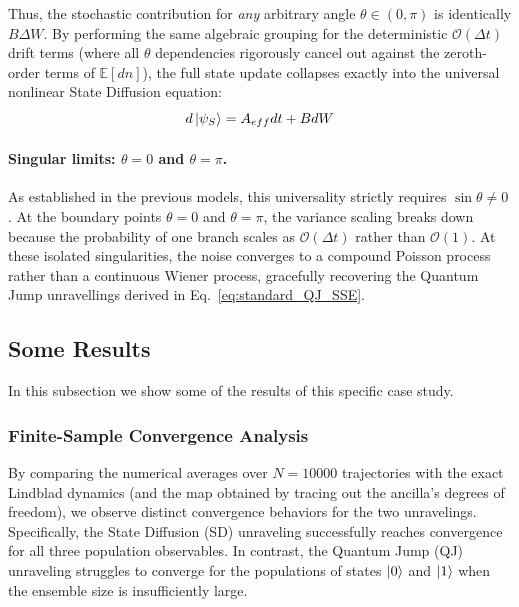 \documentclass[a4paper,12pt]{article}
\begin{document}
Thus, the stochastic contribution for \emph{any} arbitrary angle $ \theta \in (0, \pi) $ is identically $ B \Delta W $. By performing the same algebraic grouping for the deterministic $ \mathcal{O}(\Delta t) $ drift terms (where all $ \theta $ dependencies rigorously cancel out against the zeroth-order terms of $ \mathbb{E}[dn] $), the full state update collapses exactly into the universal nonlinear State Diffusion equation:
\begin{equation}
	d\ket{\psi_{S}} = A_{eff} dt + B dW
\end{equation}

\paragraph{Singular limits: $\theta=0$ and $\theta=\pi$.}
As established in the previous models, this universality strictly requires $ \sin\theta \neq 0 $. At the boundary points $ \theta = 0 $ and $ \theta = \pi $, the variance scaling breaks down because the probability of one branch scales as $ \mathcal{O}(\Delta t) $ rather than $ \mathcal{O}(1) $. At these isolated singularities, the noise converges to a compound Poisson process rather than a continuous Wiener process, gracefully recovering the Quantum Jump unravellings derived in Eq.~\ref{eq:standard_QJ_SSE}.

\newpage 

\subsection{Some Results}
\label{sub:coccia3levels_results}
In this subsection we show some of the results of this specific case study.

\subsubsection{Finite-Sample Convergence Analysis}
\label{subsub:finite_sample_convergence_analysis}

By comparing the numerical averages over $N = 10000$ trajectories with the exact Lindblad dynamics (and the map obtained by tracing out the ancilla's degrees of freedom), we observe distinct convergence behaviors for the two unravelings. Specifically, the State Diffusion (SD) unraveling successfully reaches convergence for all three population observables. In contrast, the Quantum Jump (QJ) unraveling struggles to converge for the populations of states $\ket{0}$ and $\ket{1}$ when the ensemble size is insufficiently large.
\end{document}
